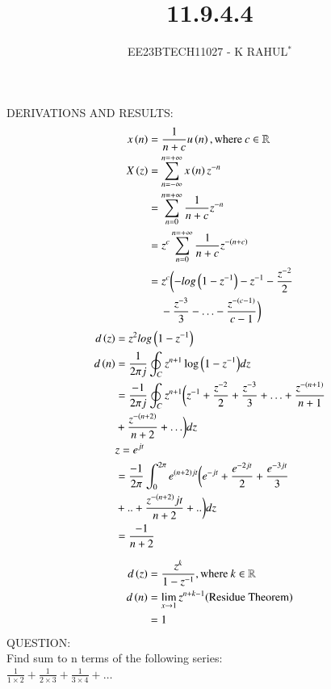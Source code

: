 \documentclass[journal,12pt,twocolumn]{IEEEtran}
\theoremstyle{remark}
\begin{document}

\vspace{3cm}
\title{11.9.4.4}
\author{EE23BTECH11027 - K RAHUL$^{*}$%
}
\maketitle
\newpage
\bigskip
\renewcommand{\thefigure}{\theenumi}
\renewcommand{\thetable}{\theenumi}
DERIVATIONS AND RESULTS: \\
\begin{align}
    x\left(n\right) &= \frac{1}{n+c} u\left(n\right),\text{where} \: c \in \mathbb{R}\\
    X\left(z\right) &= \sum_{n= -\infty}^{n= +\infty} x\left(n\right)z^{-n}\\
    &=\sum_{n = 0}^{n = +\infty} \frac{1}{n+c}z^{-n}\\
    &= z^c\sum_{n = 0}^{n = +\infty} \frac{1}{n+c}z^{-\left(n+c\right)}\\
    &= z^c \biggl(-log\left(1-z^{-1}\right)- z^{-1}-\frac{z^{-2}}{2}\notag \\& \;\;\;\;-\frac{z^{-3}}{3} - \ldots -\frac{z^{-(c-1)}}{c-1} \biggr)\label{11027_eq1}
\end{align} 
\begin{align}
    d\left(z\right) &= z^{2}log\left(1-z^{-1}\right)\\
    d\left(n\right)&=\frac{1}{2\pi j} \oint _C z^{n+1}\log{\ensuremath{\left(1-z^{-1}\right)}}dz\\
    &=\frac{-1}{2\pi j} \oint _C z^{n+1}\biggl(z^{-1}+\frac{z^{-2}}{2} + \frac{z^{-3}}{3}+\ldots + \frac{z^{-(n+1)}}{n+1} \notag\\ \;\: &+  \frac{z^{-\left(n+2\right)}}{n+2}+ \ldots \biggr) dz\\
    &z=e^{jt}\\
    &=\frac{-1}{2\pi} \int_{0}^{2\pi} e^{\left(n+2\right)jt}\biggl(e^{-jt}+\frac{e^{-2jt}}{2} + \frac{e^{-3jt}}{3} \notag \\&+.. +\frac{z^{-\left(n+2\right)}jt}{n+2}+..\biggr) dz\\
    &=\frac{-1}{n+2}\label{11027_eq2}
\end{align}

\begin{align}
    d\left(z\right)&= \frac{z^k}{1-z^{-1}},\text{where} \: k \in \mathbb{R}\\
    d\left(n\right)&= \lim_{x \to 1}z^{n+k-1} \text{(Residue Theorem)}\\
    &= 1\label{11027_eq3}
\end{align}
\bigskip
QUESTION:\\
Find sum to n terms of the following series:\\
$\frac{1}{1 \times 2} + \frac{1}{2 \times 3} + \frac{1}{3 \times 4} + \ldots$
\bigskip \bigskip
\end{document}
